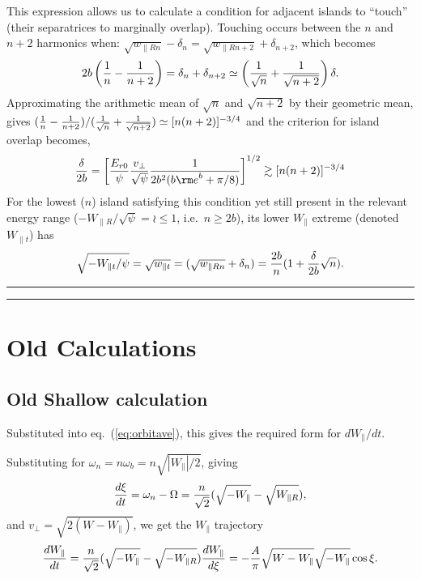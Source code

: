 This expression allows us to calculate a condition for adjacent
islands to ``touch'' (their separatrices to marginally
overlap). Touching occurs between the $n$ and $n+2$ harmonics when:
$\sqrt{w_{\parallel R n}}-\delta_n=\sqrt{w_{\parallel R
    n+2}}+\delta_{n+2}$, which becomes 
\begin{equation}
  \label{eq:touch}
  2b\left({1\over n}-{1\over n+2}\right) 
  =\delta_n+ \delta_{n+2}
  \simeq\left({1\over\sqrt{n}}+{1\over\sqrt{n+2}}\right)\delta.
\end{equation}
Approximating the arithmetic mean of $\sqrt{n}$ and $\sqrt{n+2}$ by
their geometric mean, gives $({1\over n}-{1\over n+2})/({1\over\sqrt
  n}+{1\over\sqrt{n+2}})\simeq [n(n+2)]^{-3/4} $ and 
the criterion for island overlap becomes,
\begin{equation}
  \label{eq:touchmean}
  {\delta\over 2b}=
  \left[  {E_{r0}\over\psi}
   {v_\perp\over\sqrt\psi}{1\over 
     2b^2(b{\rm e}^b+\pi/8)
   }\right]^{1/2}
  \gtrsim  [n(n+2)]^{-3/4}
\end{equation}
For the lowest ($n$) island satisfying this condition yet still
present in the relevant energy range
($-W_{\parallel R}/\sqrt\psi=\wr\le 1$, i.e.\ $n\ge2b$), its lower
$W_\parallel$ extreme (denoted $W_{\parallel t}$) has
\begin{equation}\label{eq:wpt}
\sqrt{-W_{\parallel t}/\psi}=\sqrt{w_{\parallel t}} = (\sqrt{w_{\parallel R n}}+\delta_n)={2b\over
  n}(1+{\delta\over 2b}\sqrt{n}).
\end{equation}


\hrule
\hrule
\section{Old Calculations}
\subsection{Old Shallow calculation}

Substituted into eq.\ (\ref{eq:orbitave}), this gives the required
form for $dW_\parallel/dt$.

Substituting for $\omega_n=n\omega_b=n\sqrt{|W_\parallel|/2}$, giving
\begin{equation}
  \label{eq:xideriv}
  {d\xi\over dt} =
  \omega_n-\Omega={n\over\sqrt{2}}(\sqrt{-W_\parallel} -
  \sqrt{W_{\parallel R}}),
\end{equation}
 and
$v_\perp=\sqrt{2(W-W_\parallel)}$,
we get the $W_\parallel$ trajectory
\begin{equation}\label{eq:dwdt}
  {dW_\parallel\over dt} = {n\over\sqrt{2}}(\sqrt{-W_\parallel} -
  \sqrt{-W_{\parallel R}}) {dW_\parallel\over d\xi} 
  = - {A \over \pi}\sqrt{W-W_\parallel}\sqrt{-W_\parallel}\cos\xi.
\end{equation}

